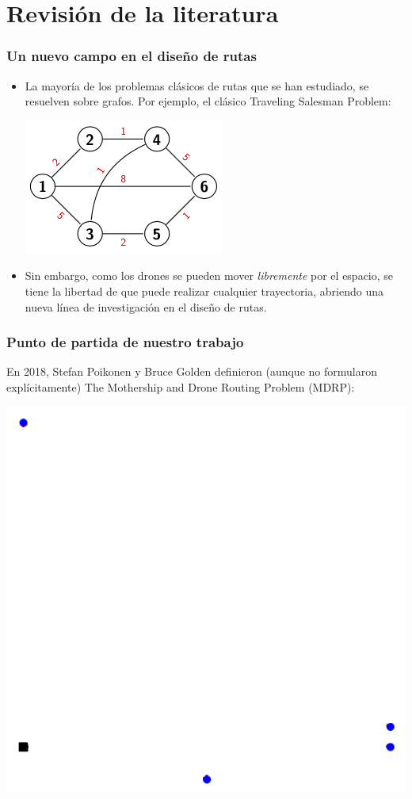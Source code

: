 \documentclass[slidestop,usepdftitle=false, xcolor=table]{beamer}
\begin{document}
	\section{Revisión de la literatura}
	\begin{frame}
		\frametitle{Un nuevo campo en el diseño de rutas}
		\begin{itemize}
		\item La mayoría de los problemas clásicos de rutas que se han estudiado, se resuelven sobre grafos. Por ejemplo, el clásico Traveling Salesman Problem:
		\begin{center}
			\includegraphics[width=0.4\linewidth]{TSP}
		\end{center}
		\pause
		\item Sin embargo, como los drones se pueden mover \textit{libremente} por el espacio, se tiene la libertad de que puede realizar cualquier trayectoria, abriendo una nueva línea de investigación en el diseño de rutas.
		\end{itemize}
	\end{frame}

	\begin{frame}
		\frametitle{Punto de partida de nuestro trabajo}
		En 2018, Stefan Poikonen y Bruce Golden definieron (aunque no formularon explícitamente) The Mothership and Drone Routing Problem (MDRP):
		\begin{center}
			\includegraphics[width=0.5\linewidth]{poikonen_2}
		\end{center}
	\end{frame}
\end{document}
